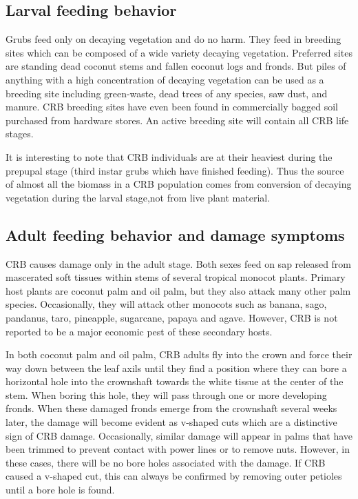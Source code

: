 \documentclass[twocolumn,letterpaper]{scrartcl}
\begin{document}
\subsection{Larval feeding behavior}

Grubs feed only on decaying vegetation and do no harm. They feed in breeding sites which can be composed of a wide variety decaying vegetation. Preferred sites are standing dead coconut stems and fallen coconut logs and fronds. But piles of anything with a high concentration of decaying vegetation can be used as a breeding site including green-waste, dead trees of any species, saw dust, and manure. CRB breeding sites have even been found in commercially bagged soil purchased from  hardware stores. An active breeding site will contain all CRB life stages.

It is interesting to note that CRB individuals are at their heaviest during the prepupal stage (third instar grubs which have finished feeding). Thus the source of almost all the biomass in a CRB population comes from conversion of decaying vegetation during the larval stage,not from live plant material.

\subsection{Adult feeding behavior and damage symptoms}

CRB causes damage only in the adult stage.  
Both sexes feed on sap released from mascerated soft tissues within stems of several tropical monocot plants. Primary host plants are coconut palm and oil palm, but they also attack many other palm species.  Occasionally, they will attack other monocots such as banana, sago, pandanus, taro, pineapple, sugarcane, papaya and agave. However, CRB is not reported to be a major economic pest of these secondary hosts.

In both coconut
palm and oil palm, CRB adults fly into the crown and force their way down between the leaf axils until they find
a position where they can bore a horizontal hole into the crownshaft towards the white tissue at the center of the stem. When boring this hole, they will pass through one or more developing fronds. When these damaged fronds emerge from the crownshaft several weeks later, the damage will become evident as v-shaped cuts which are a distinctive sign of CRB damage. Occasionally, similar damage will appear in palms that have been trimmed to prevent contact with power lines or to remove nuts. However, in these cases, there will be no bore holes associated with the damage. If CRB caused a v-shaped cut, this can always be confirmed by removing outer petioles until a bore hole is found.
\end{document}
